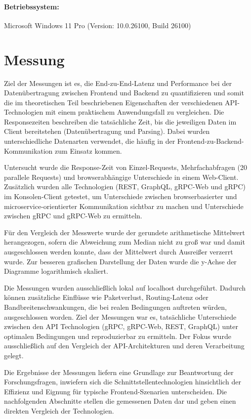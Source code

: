 \paragraph{Betriebssystem:}
Microsoft Windows 11 Pro (Version: 10.0.26100, Build 26100)

\clearpage
\section{Messung}
Ziel der Messungen ist es, die End-zu-End-Latenz und Performance bei der Datenübertragung zwischen Frontend und Backend zu quantifizieren und somit die im theoretischen Teil beschriebenen Eigenschaften der verschiedenen API-Technologien mit einem praktischem Anwendungsfall zu vergleichen.  
Die Responsezeiten beschreiben die tatsächliche Zeit, bis die jeweiligen Daten im Client bereitstehen (Datenübertragung und Parsing). Dabei wurden unterschiedliche Datenarten verwendet, die häufig in der Frontend-zu-Backend-Kommunikation zum Einsatz kommen.  

Untersucht wurde die Response-Zeit von Einzel-Requests, Mehrfachabfragen (20 parallele Requests) und browserabhängige Unterschiede in einem Web-Client. Zusätzlich wurden alle Technologien (REST, GraphQL, gRPC-Web und gRPC) im Konsolen-Client getestet, um Unterschiede zwischen browserbasierter und microservice-orientierter Kommunikation sichtbar zu machen und Unterschiede zwischen gRPC und gRPC-Web zu ermitteln.

Für den Vergleich der Messwerte wurde der gerundete arithmetische Mittelwert herangezogen, sofern die Abweichung zum Median nicht zu groß war und damit ausgeschlossen werden konnte, dass der Mittelwert durch Ausreißer verzerrt wurde. Zur besseren grafischen Darstellung der Daten wurde die y-Achse der Diagramme logarithmisch skaliert.

Die Messungen wurden ausschließlich lokal auf localhost durchgeführt. Dadurch können zusätzliche Einflüsse wie Paketverlust, Routing-Latenz oder Bandbreitenschwankungen, die bei realen Bedingungen auftreten würden, ausgeschlossen worden. Ziel der Messungen war es, tatsächliche Unterschiede zwischen den API Technologien (gRPC, gRPC-Web, REST, GraphQL) unter optimalen Bedingungen und reproduzierbar zu ermitteln.
Der Fokus wurde ausschließlich auf den Vergleich der API-Architekturen und deren Verarbeitung gelegt.

Die Ergebnisse der Messungen liefern eine Grundlage zur Beantwortung der Forschungsfragen, inwiefern sich die Schnittstellentechnologien hinsichtlich der Effizienz und Eignung für typische Frontend-Szenarien unterscheiden.  
Die nachfolgenden Abschnitte stellen die gemessenen Daten dar und geben einen direkten Vergleich der Technologien.

